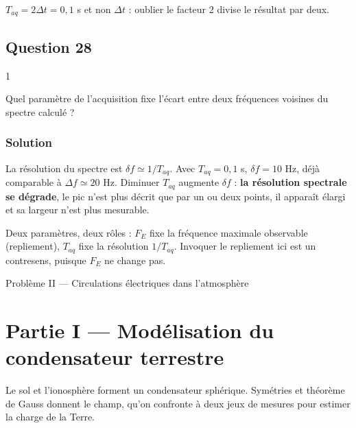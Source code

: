 \documentclass[11pt,a4paper]{article}
\begin{document}
\begin{piege}

\(T_{aq}=2\Delta t=0{,}1\) s et non \(\Delta t\) : oublier le facteur 2 divise le résultat par deux.

\end{piege}

\hypertarget{question-28}{%
\subsection{Question 28}\label{question-28}}

\begin{indication}{1}

Quel paramètre de l'acquisition fixe l'écart entre deux fréquences voisines du spectre calculé ?

\end{indication}

\hypertarget{solution-27}{%
\subsubsection{Solution}\label{solution-27}}

La résolution du spectre est \(\delta f\simeq1/T_{aq}\). Avec \(T_{aq}=0{,}1\) s, \(\delta f=10\) Hz, déjà comparable à \(\Delta f\simeq20\) Hz. Diminuer \(T_{aq}\) augmente \(\delta f\) : \textbf{la résolution spectrale se dégrade}, le pic n'est plus décrit que par un ou deux points, il apparaît élargi et sa largeur n'est plus mesurable.

\begin{methode}

Deux paramètres, deux rôles : \(F_E\) fixe la fréquence maximale observable (repliement), \(T_{aq}\) fixe la résolution \(1/T_{aq}\). Invoquer le repliement ici est un contresens, puisque \(F_E\) ne change pas.

\end{methode}

Problème II --- Circulations électriques dans l'atmosphère

\hypertarget{partie-i-moduxe9lisation-du-condensateur-terrestre}{%
\section{Partie I --- Modélisation du condensateur terrestre}\label{partie-i-moduxe9lisation-du-condensateur-terrestre}}

Le sol et l'ionosphère forment un condensateur sphérique. Symétries et théorème de Gauss donnent le champ, qu'on confronte à deux jeux de mesures pour estimer la charge de la Terre.
\end{document}
